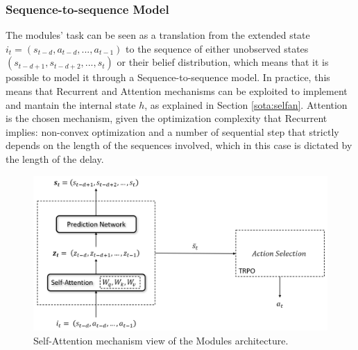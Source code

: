             \subsubsection{Sequence-to-sequence Model}
                The modules' task can be seen as a translation from the extended state $i_t = (s_{t-d}, a_{t-d}, ..., a_{t-1})$ to the sequence of either unobserved states $(s_{t-d+1}, s_{t-d+2}, ..., s_t)$ or their belief distribution, which means that it is possible to model it through a Sequence-to-sequence model. In practice, this means that Recurrent and Attention mechanisms can be exploited to implement and mantain the internal state $h$, as explained in Section \ref{sota:selfan}. Attention is the chosen mechanism, given the optimization complexity that Recurrent implies: non-convex optimization and a number of sequential step that strictly depends on the length of the sequences involved, which in this case is dictated by the length of the delay.
            
            \begin{figure}[!t]
                    \centering
                    \includegraphics[width=15cm, keepaspectratio]{images/module/selfattention_view.png}
                    \caption{Self-Attention mechanism view of the Modules architecture.}
                    \label{fig:module_selfattention_view}
            \end{figure}
            

